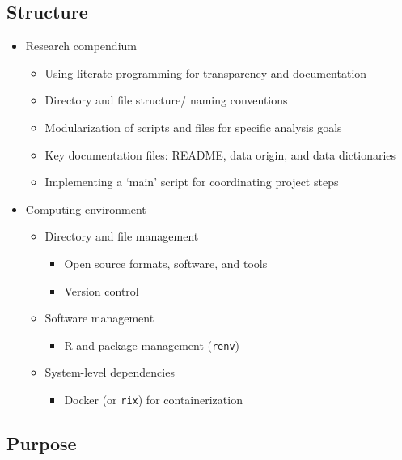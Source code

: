 \documentclass[
  letterpaper,
]{latex/krantz}
\providecommand{\tightlist}{%
  \setlength{\itemsep}{0pt}\setlength{\parskip}{0pt}}\usepackage{longtable,booktabs,array}
\theoremstyle{definition}
\theoremstyle{remark}
\begin{document}
\subsection{Structure}\label{sec-contr-ro-structure}

\begin{itemize}
\tightlist
\item
  Research compendium

  \begin{itemize}
  \tightlist
  \item
    Using literate programming for transparency and documentation
  \item
    Directory and file structure/ naming conventions
  \item
    Modularization of scripts and files for specific analysis goals
  \item
    Key documentation files: README, data origin, and data dictionaries
  \item
    Implementing a `main' script for coordinating project steps
  \end{itemize}
\item
  Computing environment

  \begin{itemize}
  \tightlist
  \item
    Directory and file management

    \begin{itemize}
    \tightlist
    \item
      Open source formats, software, and tools
    \item
      Version control
    \end{itemize}
  \item
    Software management

    \begin{itemize}
    \tightlist
    \item
      R and package management (\texttt{renv})
    \end{itemize}
  \item
    System-level dependencies

    \begin{itemize}
    \tightlist
    \item
      Docker (or \texttt{rix}) for containerization
    \end{itemize}
  \end{itemize}
\end{itemize}

\subsection{Purpose}\label{sec-contr-ro-purpose}
\end{document}
